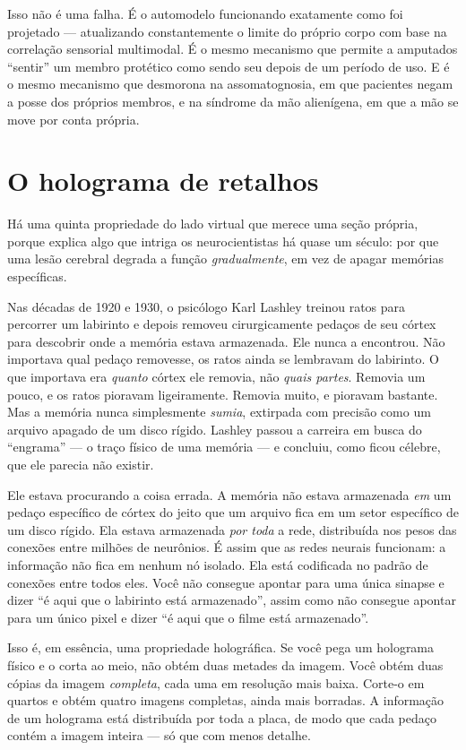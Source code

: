 \documentclass[11pt, twoside, openright]{book}
\begin{document}
Isso não é uma falha. É o automodelo funcionando exatamente como foi projetado --- atualizando constantemente o limite do próprio corpo com base na correlação sensorial multimodal. É o mesmo mecanismo que permite a amputados ``sentir'' um membro protético como sendo seu depois de um período de uso. E é o mesmo mecanismo que desmorona na assomatognosia, em que pacientes negam a posse dos próprios membros, e na síndrome da mão alienígena, em que a mão se move por conta própria.

\section*{O holograma de retalhos}

Há uma quinta propriedade do lado virtual que merece uma seção própria, porque explica algo que intriga os neurocientistas há quase um século: por que uma lesão cerebral degrada a função \textit{gradualmente}, em vez de apagar memórias específicas.

Nas décadas de 1920 e 1930, o psicólogo Karl Lashley treinou ratos para percorrer um labirinto e depois removeu cirurgicamente pedaços de seu córtex para descobrir onde a memória estava armazenada. Ele nunca a encontrou. Não importava qual pedaço removesse, os ratos ainda se lembravam do labirinto. O que importava era \textit{quanto} córtex ele removia, não \textit{quais partes}. Removia um pouco, e os ratos pioravam ligeiramente. Removia muito, e pioravam bastante. Mas a memória nunca simplesmente \textit{sumia}, extirpada com precisão como um arquivo apagado de um disco rígido. Lashley passou a carreira em busca do ``engrama'' --- o traço físico de uma memória --- e concluiu, como ficou célebre, que ele parecia não existir.

Ele estava procurando a coisa errada. A memória não estava armazenada \textit{em} um pedaço específico de córtex do jeito que um arquivo fica em um setor específico de um disco rígido. Ela estava armazenada \textit{por toda} a rede, distribuída nos pesos das conexões entre milhões de neurônios. É assim que as redes neurais funcionam: a informação não fica em nenhum nó isolado. Ela está codificada no padrão de conexões entre todos eles. Você não consegue apontar para uma única sinapse e dizer ``é aqui que o labirinto está armazenado'', assim como não consegue apontar para um único pixel e dizer ``é aqui que o filme está armazenado''.

Isso é, em essência, uma propriedade holográfica. Se você pega um holograma físico e o corta ao meio, não obtém duas metades da imagem. Você obtém duas cópias da imagem \textit{completa}, cada uma em resolução mais baixa. Corte-o em quartos e obtém quatro imagens completas, ainda mais borradas. A informação de um holograma está distribuída por toda a placa, de modo que cada pedaço contém a imagem inteira --- só que com menos detalhe.
\end{document}
